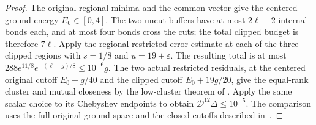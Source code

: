 \begin{proof}
    \leanok
    The original regional minima and the common vector give the centered
    ground energy $E_0\in[0,4]$. The two uncut buffers have at most
    $2\ell-2$ internal bonds each, and at most four bonds cross the cuts;
    the total clipped budget is therefore $7\ell$.
    Apply the regional restricted-error estimate at each of the three
    clipped regions with $s=1/8$ and $u=19+\varepsilon$.
    The resulting total is at most
    $288e^{11/8}e^{-(\ell-g)/8}\le10^{-6}g$.
    The two actual restricted residuals, at the centered original cutoff $E_0+g/40$
    and the clipped cutoff $E_0+19g/20$, give the equal-rank cluster and
    mutual closeness by the low-cluster theorem of
    \cite[``A low cluster from two restricted residuals'']{QICLean2026Blueprint}.
    Apply the same scalar choice to its Chebyshev endpoints to obtain
    $\mathcal D^{12}\Delta\le10^{-5}$.
    The comparison uses the full original ground space and the closed
    cutoffs described in~\cite{gap:alvv16_spectral_projector_boundary}.
\end{proof}


